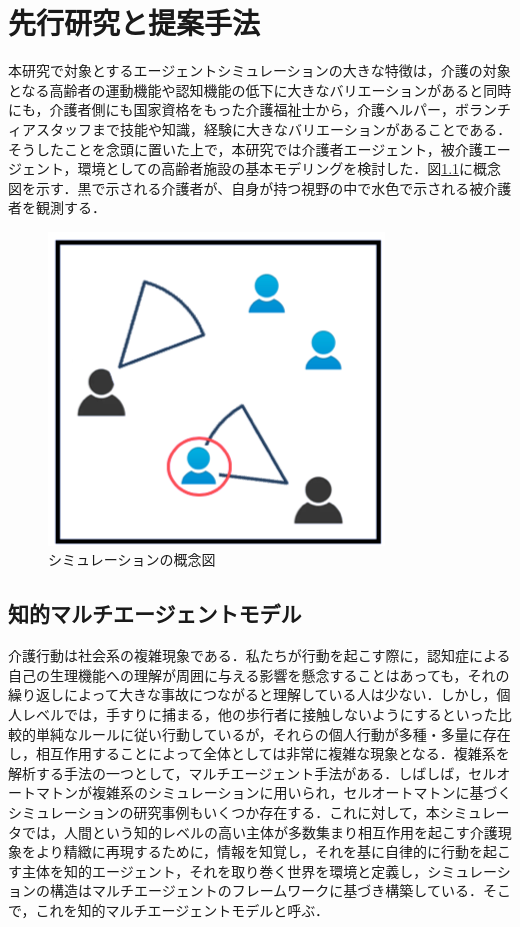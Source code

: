 \chapter{先行研究と提案手法}

本研究で対象とするエージェントシミュレーションの大きな特徴は，介護の対象となる高齢者の運動機能や認知機能の低下に大きなバリエーションがあると同時にも，介護者側にも国家資格をもった介護福祉士から，介護ヘルパー，ボランチィアスタッフまで技能や知識，経験に大きなバリエーションがあることである．そうしたことを念頭に置いた上で，本研究では介護者エージェント，被介護エージェント，環境としての高齢者施設の基本モデリングを検討した．図\ref{concept_simulation}に概念図を示す．黒で示される介護者が、自身が持つ視野の中で水色で示される被介護者を観測する．

\begin{figure}[htb]
\begin{center}
\includegraphics[scale=2.0]{figures/concept_simulation.png}
\caption[シミュレーションの概念図]{シミュレーションの概念図 \label{concept_simulation}}
\end{center}
\end{figure}

\section{知的マルチエージェントモデル}

介護行動は社会系の複雑現象である．私たちが行動を起こす際に，認知症による自己の生理機能への理解が周囲に与える影響を懸念することはあっても，それの繰り返しによって大きな事故につながると理解している人は少ない．しかし，個人レベルでは，手すりに捕まる，他の歩行者に接触しないようにするといった比較的単純なルールに従い行動しているが，それらの個人行動が多種・多量に存在し，相互作用することによって全体としては非常に複雑な現象となる．複雑系を解析する手法の一つとして，マルチエージェント手法がある．しばしば，セルオートマトンが複雑系のシミュレーションに用いられ，セルオートマトンに基づくシミュレーションの研究事例もいくつか存在する．これに対して，本シミュレータでは，人間という知的レベルの高い主体が多数集まり相互作用を起こす介護現象をより精緻に再現するために，情報を知覚し，それを基に自律的に行動を起こす主体を知的エージェント，それを取り巻く世界を環境と定義し，シミュレーションの構造はマルチエージェントのフレームワークに基づき構築している．そこで，これを知的マルチエージェントモデルと呼ぶ．

